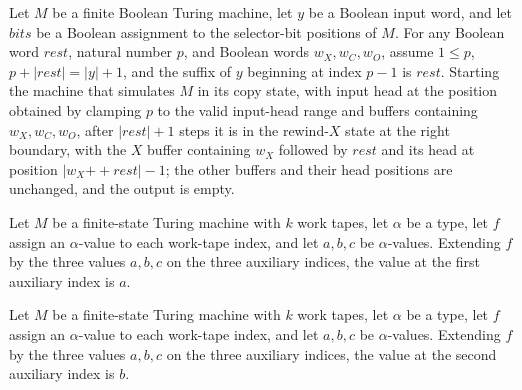 \begin{theorem}
\label{Complexity.Meyer.cpy_run}
\leanok
{}
Let $M$ be a finite Boolean Turing machine, let $y$ be a Boolean input word, and let
$bits$ be a Boolean assignment to the selector-bit positions of $M$. For any Boolean
word $rest$, natural number $p$, and Boolean words $w_X,w_C,w_O$, assume $1\le p$,
$p+|rest|=|y|+1$, and the suffix of $y$ beginning at index $p-1$ is $rest$. Starting the
machine that simulates $M$ in its copy state, with input head at the position obtained
by clamping $p$ to the valid input-head range and buffers containing $w_X,w_C,w_O$,
after $|rest|+1$ steps it is in the rewind-$X$ state at the right boundary, with the $X$
buffer containing $w_X$ followed by $rest$ and its head at position
$|w_X\mathbin{++}rest|-1$; the other buffers and their head positions are
unchanged, and the output is empty.
\end{theorem}

\begin{theorem}
\label{Complexity.Meyer.aux_read0}
\leanok
{}
Let $M$ be a finite-state Turing machine with $k$ work tapes, let $\alpha$ be a type,
let $f$ assign an $\alpha$-value to each work-tape index, and let $a,b,c$ be
$\alpha$-values. Extending $f$ by the three values $a,b,c$ on the three auxiliary
indices, the value at the first auxiliary index is $a$.
\end{theorem}

\begin{theorem}
\label{Complexity.Meyer.aux_read1}
\leanok
{}
Let $M$ be a finite-state Turing machine with $k$ work tapes, let $\alpha$ be a type,
let $f$ assign an $\alpha$-value to each work-tape index, and let $a,b,c$ be
$\alpha$-values. Extending $f$ by the three values $a,b,c$ on the three auxiliary
indices, the value at the second auxiliary index is $b$.
\end{theorem}

